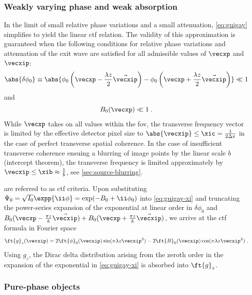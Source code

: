 \documentclass[
twoside,
openright,
titlepage,
numbers=noenddot,
headinclude,
fleqn,
a4paper,
footinclude=true,
cleardoublepage=empty,
abstractoff,
BCOR=5mm,
paper=a4,
fontsize=11pt,
british,ngerman,american,
]{scrreprt}
\begin{document}
\subsubsection{Weakly varying phase and weak absorption}
\label{sec:weak-phase-absorption}

In the limit of small relative phase variations and a small
attenuation, \cref{eq:guigay} simplifies to yield the linear \ac{ctf}
relation.  The validity of this approximation is guaranteed when the
following conditions for relative phase variations and attenuation of
the exit wave are satisfied for all admissible values of $\vecxp$ and
$\vecxip$:
\begin{equation}
  \label{eq:weak-phase}
  \abs{\delta\phi_0}\equiv
  \abs{\phi_0\left(\vecxp-\frac{\lambda z}{2}\vec{\vecxip}\right)
    -\phi_0\left(\vecxp+\frac{\lambda z}{2}\vec{\vecxip}\right)} 
  \ll 1
\end{equation}
and
\begin{equation}
  \label{eq:small-absorption}
  B_0(\vecxp) \ll 1\;.
\end{equation}
While $\vecxp$ takes on all values within the \acl{fov}, the
transverse frequency vector is limited by the effective detector pixel
size to $\abs{\vecxip}\le\xic=\frac{1}{2\Delta x}$ in the case of
perfect transverse spatial coherence.  In the case of insufficient
transverse coherence ensuing a blurring of image points by the linear
scale $b$ (intercept theorem), the transverse frequency is limited
approximately by $\vecxip\le\xib\approx\frac{1}{b}$, see
\cref{sec:source-blurring}.

 are referred to as \ac{ctf}
criteria.  Upon substituting
$\Psi_0=\sqrt{I_0}\expp{\ii\phi}=\exp(-B_0+\ii\phi_0)$ into
\cref{eq:guigay-xi} and truncating the power-series expansion of the
exponential at linear order in $\delta\phi_0$ and
$B_0(\vecxp-\frac{\pi z}{k}\vec{\vecxip})
+B_0(\vecxp+\frac{\pi z}{k}\vec{\vecxip})$, we arrive at the
\ac{ctf} formula in Fourier space 
\begin{equation}
  \label{eq:ctf-full}
    \ft{g}_z(\vecxip) =
    2\ft{\phi}_0(\vecxip)\sin(\pi\lambda z\vecxip^2)
    -2\ft{B}_0(\vecxip)\cos(\pi\lambda z\vecxip^2) \;.
\end{equation}
Using $g_z$, the Dirac delta distribution arising from the zeroth
order in the expansion of the exponential in \cref{eq:guigay-xi} is
absorbed into $\ft{g}_z$.

\subsubsection{Pure-phase objects}
\label{sec:ctf-pure-phase}
\end{document}
